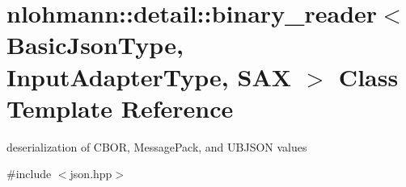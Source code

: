 \hypertarget{classnlohmann_1_1detail_1_1binary__reader}{}\section{nlohmann\+:\+:detail\+:\+:binary\+\_\+reader$<$ Basic\+Json\+Type, Input\+Adapter\+Type, S\+AX $>$ Class Template Reference}
\label{classnlohmann_1_1detail_1_1binary__reader}


deserialization of C\+B\+OR, Message\+Pack, and U\+B\+J\+S\+ON values  




{\ttfamily \#include $<$json.\+hpp$>$}

